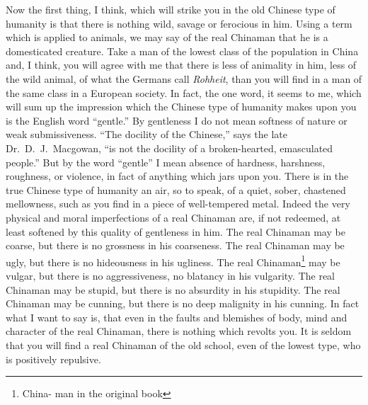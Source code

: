 Now the first thing, I think, which will strike you in the old Chinese type of humanity is that there is nothing wild, savage or ferocious in him.
Using a term which is applied to animals, we may say of the real Chinaman that he is a domesticated creature.
Take a man of the lowest class of the population in China and, I think, you will agree with me that there is less of animality in him, less of the wild animal, of what the Germans call \emph{Rohheit}, than you will find in a man of the same class in a European society.
In fact, the one word, it seems to me, which will sum up the impression which the Chinese type of humanity makes upon you is the English word ``gentle.''
By gentleness I do not mean softness of nature or weak submissiveness.
``The docility of the Chinese,'' says the late Dr.~D.~J.~Macgowan,  ``is not the docility of a broken-hearted, emasculated people.''
But by the word ``gentle'' I mean absence of hardness, harshness, roughness, or violence, in fact of anything which jars upon you.
There is in the true Chinese type of humanity an air, so to speak, of a quiet, sober, chastened mellowness, such as you find in a piece of well-tempered metal.
Indeed the very physical and moral imperfections of a real Chinaman are, if not redeemed, at least softened by this quality of gentleness in him.
The real Chinaman may be coarse, but there is no grossness in his coarseness.
The real Chinaman may be ugly, but there is no hideousness in his ugliness.
The real Chinaman\footnote{China- man in the original book} may be vulgar, but there is no aggressiveness, no blatancy in his vulgarity.
The real Chinaman may be stupid, but there is no absurdity in his stupidity.
The real Chinaman may be cunning, but there is no deep malignity in his cunning.
In fact what I want to say is, that even in the faults and blemishes of body, mind and character of the real Chinaman, there is nothing which revolts you.
It is seldom that you will find a real Chinaman of the old school, even of the lowest type, who is positively repulsive.

